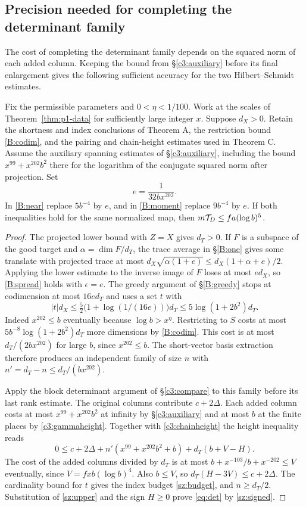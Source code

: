 \subsection{Precision needed for completing the determinant family}\label{sec:precision}
The cost of completing the determinant family depends on the squared norm
of each added column. Keeping the bound from \S\ref{c3:auxiliary}
before its final enlargement gives the following sufficient accuracy for
the two Hilbert--Schmidt estimates.

\begin{proposition}\label{prop:weakerprecision}
Fix the permissible parameters and $0<\eta<1/100$. Work at the scales
of Theorem~\ref{thm:p1-data} for sufficiently large integer $x$.
Suppose $d_X>0$. Retain the shortness and index conclusions of Theorem A,
the restriction bound \eqref{B:codim}, and the pairing and chain-height
estimates used in Theorem C. Assume the auxiliary spanning estimates
of \S\ref{c3:auxiliary}, including the bound $x^{99}+x^{202}b^2$
there for the logarithm of the conjugate squared norm after projection.
Set
\[
                      e=\frac{1}{32b x^{202}} .
\]
In \eqref{B:near} replace $5b^{-4}$ by $e$, and in
\eqref{B:moment} replace $9b^{-4}$ by $e$. If both inequalities hold
for the same normalized map, then $m\mathcal T_D\le fa(\log b)^5$.
\end{proposition}
\begin{proof}
The projected lower bound with $Z=X$ gives $d_T>0$. If $F$ is a
subspace of the good target and $\alpha=\dim F/d_T$, the trace
average in \S\ref{B:one} gives some translate with projected trace
at most $d_X\sqrt{\alpha(1+e)}\le d_X(1+\alpha+e)/2$.
Applying the lower estimate to the inverse image of $F$ loses
at most $ed_X$, so \eqref{B:spread} holds with $\epsilon=e$.
The greedy argument of \S\ref{B:greedy} stops at codimension at
most $16e d_T$ and uses a set $t$ with
\[
 |t|d_X\le \tfrac52\bigl(1+\log(1/(16e))\bigr)d_T
          \le5\log(1+2b^2)d_T .
\]
Indeed $x^{202}\le b$ eventually because $\log b>x^\eta$.
Restricting to $S$ costs at most $5b^{-8}\log(1+2b^2)d_T$
more dimensions by \eqref{B:codim}. This cost is at most
$d_T/(2b x^{202})$ for large $b$, since $x^{202}\le b$.
The short-vector basis extraction therefore produces an independent
family of size $n$ with $n'=d_T-n\le d_T/(b x^{202})$.

Apply the block determinant argument of \S\ref{c3:compare} to this
family before its last rank estimate. The original columns contribute
$c+2\Delta$. Each added column costs at most $x^{99}+x^{202}b^2$
at infinity by \S\ref{c3:auxiliary} and at most $b$ at the finite
places by \eqref{c3:gammaheight}. Together with \eqref{c3:chainheight}
the height inequality reads
\[
 0\le c+2\Delta+n'(x^{99}+x^{202}b^2+b)+d_T(b+V-H).
\]
The cost of the added columns divided by $d_T$ is at most
$b+x^{-103}/b+x^{-202}\le V$ eventually, since
$V=f x b(\log b)^4$. Also $b\le V$, so $d_T(H-3V)\le c+2\Delta$.
The cardinality bound for $t$ gives the index budget \eqref{sz:budget},
and $n\ge d_T/2$. Substitution of \eqref{sz:upper} and the sign
$H\ge0$ prove \eqref{eq:det} by \eqref{sz:signed}.
\end{proof}

